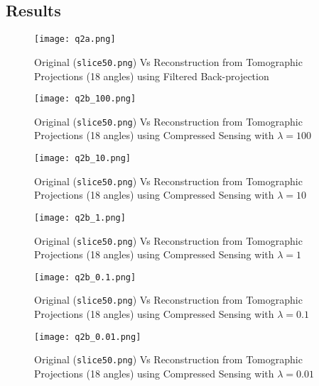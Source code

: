 \documentclass[fleqn, 11pt]{article}
\begin{document}
\subsection*{Results}
\begin{figure}[H]
    \centering
    \texttt{[image: q2a.png]}
    \caption{Original (\texttt{slice50.png}) Vs Reconstruction from Tomographic Projections (18 angles) using Filtered Back-projection}
\end{figure}

\begin{figure}[H]
    \centering
    \texttt{[image: q2b\_100.png]}
    \caption{Original (\texttt{slice50.png}) Vs Reconstruction from Tomographic Projections (18 angles) using Compressed Sensing with $\lambda = 100$}
\end{figure}
\begin{figure}[H]
    \centering
    \texttt{[image: q2b\_10.png]}
    \caption{Original (\texttt{slice50.png}) Vs Reconstruction from Tomographic Projections (18 angles) using Compressed Sensing with $\lambda = 10$}
\end{figure}
\begin{figure}[H]
    \centering
    \texttt{[image: q2b\_1.png]}
    \caption{Original (\texttt{slice50.png}) Vs Reconstruction from Tomographic Projections (18 angles) using Compressed Sensing with $\lambda = 1$}
\end{figure}
\begin{figure}[H]
    \centering
    \texttt{[image: q2b\_0.1.png]}
    \caption{Original (\texttt{slice50.png}) Vs Reconstruction from Tomographic Projections (18 angles) using Compressed Sensing with $\lambda = 0.1$}
\end{figure}
\begin{figure}[H]
    \centering
    \texttt{[image: q2b\_0.01.png]}
    \caption{Original (\texttt{slice50.png}) Vs Reconstruction from Tomographic Projections (18 angles) using Compressed Sensing with $\lambda = 0.01$}
\end{figure}
\end{document}
